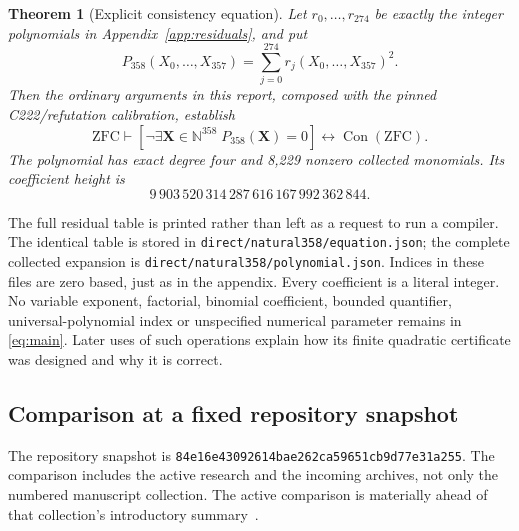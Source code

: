 \documentclass[11pt]{article}
\newtheorem{theorem}{Theorem}[section]
\theoremstyle{definition}\newtheorem{definition}[theorem]{Definition}
\newcommand{\N}{\mathbb N}\newcommand{\Z}{\mathbb Z}\newcommand{\Q}{\mathbb Q}
\newcommand{\Con}{\operatorname{Con}}\newcommand{\Refut}{\operatorname{Ref}}
\newcommand{\file}[1]{\nolinkurl{#1}}
\newcommand{\Pmain}{P_{358}}
\begin{document}
\begin{theorem}[Explicit consistency equation]\label{thm:main}
Let $r_0,\ldots,r_{274}$ be exactly the integer polynomials in
Appendix~\ref{app:residuals}, and put
\begin{equation}\label{eq:main}
 \boxed{\displaystyle \Pmain(X_0,\ldots,X_{357})
       =\sum_{j=0}^{274}r_j(X_0,\ldots,X_{357})^2.}
\end{equation}
Then the ordinary arguments in this report, composed with the pinned
C222/refutation calibration, establish
\begin{equation}\label{eq:zfc}
 \mathrm{ZFC}\vdash
 \left[\neg\exists\boldsymbol X\in\N^{358}\;
       \Pmain(\boldsymbol X)=0\right]
 \longleftrightarrow\Con(\mathrm{ZFC}).
\end{equation}
The polynomial has exact degree four and 8,229 nonzero collected monomials.
Its coefficient height is
\[
 9\,903\,520\,314\,287\,616\,167\,992\,362\,844.
\]
\end{theorem}

The full residual table is printed rather than left as a request to run a
compiler. The identical table is stored in
\file{direct/natural358/equation.json}; the complete collected expansion is
\file{direct/natural358/polynomial.json}. Indices in these files are zero
based, just as in the appendix. Every coefficient is a literal integer.
No variable exponent, factorial, binomial coefficient, bounded quantifier,
universal-polynomial index or unspecified numerical parameter remains in
\eqref{eq:main}. Later uses of such operations explain how its finite
quadratic certificate was designed and why it is correct.

\subsection{Comparison at a fixed repository snapshot}
The repository snapshot is
\file{84e16e43092614bae262ca59651cb9d77e31a255}. The comparison includes
the active research and the incoming archives, not only the numbered
manuscript collection. The active comparison is materially ahead of that
collection's introductory summary~\cite{repo,frontier}.
\end{document}
